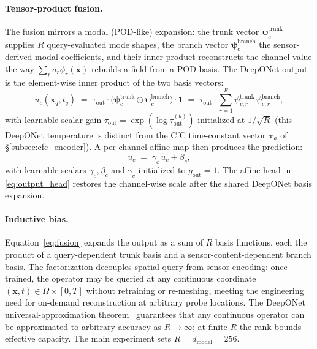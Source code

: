 \paragraph{Tensor-product fusion.}
The fusion mirrors a modal (POD-like) expansion: the trunk vector $\boldsymbol{\psi}^{\text{trunk}}_c$ supplies $R$ query-evaluated mode shapes, the branch vector $\boldsymbol{\psi}^{\text{branch}}_c$ the sensor-derived modal coefficients, and their inner product reconstructs the channel value the way $\sum_r a_r\phi_r(\mathbf{x})$ rebuilds a field from a POD basis. The DeepONet output is the element-wise inner product of the two basis vectors:
\begin{equation}
    \label{eq:fusion}
    \widetilde{u}_c(\mathbf{x}_q,t_q) \;=\; \tau_{\text{out}} \cdot \big(\boldsymbol{\psi}^{\text{trunk}}_c \odot \boldsymbol{\psi}^{\text{branch}}_c\big) \cdot \mathbf{1}
    \;=\; \tau_{\text{out}} \cdot \sum_{r=1}^R \psi^{\text{trunk}}_{c,r}\,\psi^{\text{branch}}_{c,r},
\end{equation}
with learnable scalar gain $\tau_{\text{out}} = \exp(\log\tau_{\text{out}}^{(\theta)})$ initialized at $1/\sqrt{R}$ (this DeepONet temperature is distinct from the CfC time-constant vector $\boldsymbol{\tau}_a$ of \S\ref{subsec:cfc_encoder}). A per-channel affine map then produces the prediction:
\begin{equation}
    \label{eq:output_head}
    u_c \;=\; \gamma_c\,\widetilde{u}_c + \beta_c,
\end{equation}
with learnable scalars $\gamma_c, \beta_c$ and $\gamma_c$ initialized to $g_{\text{out}} = 1$. The affine head in \eqref{eq:output_head} restores the channel-wise scale after the shared DeepONet basis expansion.

\paragraph{Inductive bias.}
Equation~\eqref{eq:fusion} expands the output as a sum of $R$ basis functions, each the product of a query-dependent trunk basis and a sensor-content-dependent branch basis. The factorization decouples spatial query from sensor encoding: once trained, the operator may be queried at any continuous coordinate $(\mathbf{x}, t)\in\Omega\times[0,T]$ without retraining or re-meshing, meeting the engineering need for on-demand reconstruction at arbitrary probe locations. The DeepONet universal-approximation theorem~\cite{Lu2021NMI} guarantees that any continuous operator can be approximated to arbitrary accuracy as $R \to \infty$; at finite $R$ the rank bounds effective capacity. The main experiment sets $R = d_{\text{model}} = 256$.

